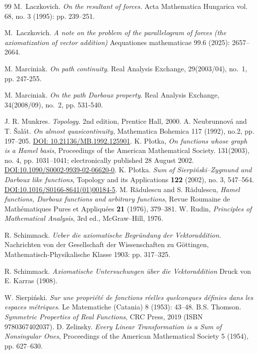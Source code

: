 \documentclass[11pt]{amsart} %
\theoremstyle{definition}
\begin{document}
\begin{thebibliography}{99}
 M.~Laczkovich. 
\newblock \emph{On the resultant of forces.}
\newblock  Acta Mathematica Hungarica vol. 68, no. 3 (1995): pp. 239--251.

 M.~Laczkovich. 
\newblock \emph{A note on the problem of the parallelogram of forces (the axiomatization of vector addition)} 
\newblock Aequationes mathematicae 99.6 (2025): 2657--2664.

 M. Marciniak. 
\newblock \emph{On path continuity}. 
\newblock Real Analysis Exchange, 29(2003/04), no.~1, pp. 247-255.

 M. Marciniak.
\newblock \emph{On the path Darboux property}.
\newblock Real Analysis Exchange, 34(2008/09), no.~2, pp. 531-540.


 J. R. Munkres. \emph{Topology}.  2nd edition, Prentice Hall, 2000.  
 A. Neubrunnov\'a and T. \v{S}al\'at. \emph{On almost quasicontinuity}, Mathematica Bohemica 117 (1992), no.2, pp. 197--205. \href{https://doi.org/10.21136/MB.1992.125901}{DOI: 10.21136/MB.1992.125901}.
 K. Płotka, \emph{On functions whose graph is a Hamel basis}, Proceedings of the American Mathematical Society. 131(2003), no. 4, pp. 1031--1041; electronically published 28 August 2002. \href{https://doi.org/10.1090/S0002-9939-02-06620-0}{DOI:10.1090/S0002-9939-02-06620-0}.
 K. Płotka. \emph{Sum of Sierpiński--Zygmund and Darboux like functions}, Topology and its Applications \textbf{122} (2002), no. 3, 547--564. 
\href{https://doi.org/10.1016/S0166-8641(01)00184-5}{DOI:10.1016/S0166-8641(01)00184-5}.
 M. Rădulescu and S. Rădulescu, \emph{Hamel functions, Darboux functions and arbitrary functions}, Revue Roumaine de Mathématiques Pures et Appliquées \textbf{21} (1976), 379--381.
  W. Rudin, \emph{Principles of Mathematical Analysis}, 3rd ed., McGraw–Hill, 1976.

 R. Schimmack. 
\newblock \emph{Ueber die axiomatische Begründung der Vektoraddition.}
\newblock Nachrichten von der Gesellschaft der Wissenschaften zu Göttingen, Mathematisch-Physikalische Klasse 1903: pp. 317--325. 

 R. Schimmack. 
\newblock \emph{Axiomatische Untersuchungen über die Vektoraddition}
\newblock  Druck von E. Karras (1908). 



 W. Sierpiński. \emph{Sur une propriété de fonctions réelles quelconques définies dans les espaces métriques}. Le Matematiche (Catania) 8 (1953): 43--48.
 B.S. Thomson. \emph{Symmetric Properties of Real Functions}, CRC Press, 2019 (ISBN 9780367402037). 
 D. Zelinsky. 
\emph{Every Linear Transformation is a Sum of Nonsingular Ones}, Proceedings of the American Mathematical Society 5 (1954), pp. 627–630.
\end{thebibliography} 
\end{document}
